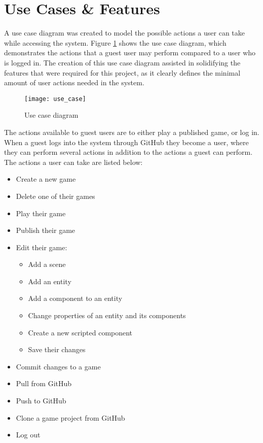 \section{Use Cases \& Features}
A use case diagram was created to model the possible actions a user can take while accessing the system. Figure \ref{fig:usecasediagram} shows the use case diagram, which demonstrates the actions that a guest user may perform compared to a user who is logged in. The creation of this use case diagram assisted in solidifying the features that were required for this project, as it clearly defines the minimal amount of user actions needed in the system.

\begin{figure}[h]
	\centering
	\texttt{[image: use\_case]}
	\caption{Use case diagram}
	\label{fig:usecasediagram}
\end{figure}

The actions available to guest users are to either play a published game, or log in. When a guest logs into the system through GitHub they become a user, where they can perform several actions in addition to the actions a guest can perform. The actions a user can take are listed below:

\begin{itemize}
	\item Create a new game
	\item Delete one of their games
	\item Play their game
	\item Publish their game
	\item Edit their game:
	\begin{itemize}
		\item Add a scene
		\item Add an entity
		\item Add a component to an entity
		\item Change properties of an entity and its components
		\item Create a new scripted component
		\item Save their changes
	\end{itemize}
	\item Commit changes to a game
	\item Pull from GitHub
	\item Push to GitHub
	\item Clone a game project from GitHub
	\item Log out
\end{itemize}